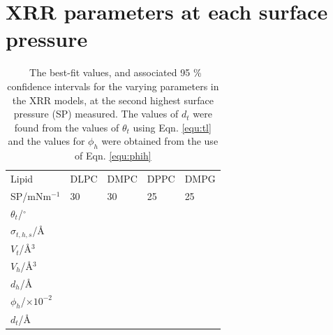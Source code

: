 \documentclass[11pt,a4paper]{article}
\begin{document}
\section{XRR parameters at each surface pressure}

%
\begin{table}
	\caption{\ The best-fit values, and associated 95 \% confidence intervals for the varying parameters in the XRR models, at the second highest surface pressure (SP) measured. The values of $d_t$ were found from the values of $\theta_t$ using Eqn. \ref{equ:tl} and the values for $\phi_h$ were obtained from the use of Eqn. \ref{equ:phih}}
	\label{tab:liptab1}
	\begin{tabular*}{0.48\textwidth}{@{\extracolsep{\fill}}lllll}
		\hline
		Lipid & DLPC & DMPC & DPPC & DMPG \\
    SP/mNm$^{-1}$ & 30 & 30 & 25 & 25 \\
		\hline
		$\theta_t$/$^\circ$ &  &  &  &  \\
		$\sigma_{t,h,s}$/\AA &  &  &  &  \\
    \hline
    $V_t$/\AA$^3$ &  &  &  &  \\
		$V_h$/\AA$^3$ &  &  &  &  \\
		$d_h$/\AA &  &  &  &  \\
    \hline
    $\phi_h$/$\times10^{-2}$ &  &  &  &  \\
		$d_t$/\AA &  &  &  &  \\
		\hline
	\end{tabular*}
\end{table}
%
%
\end{document}
